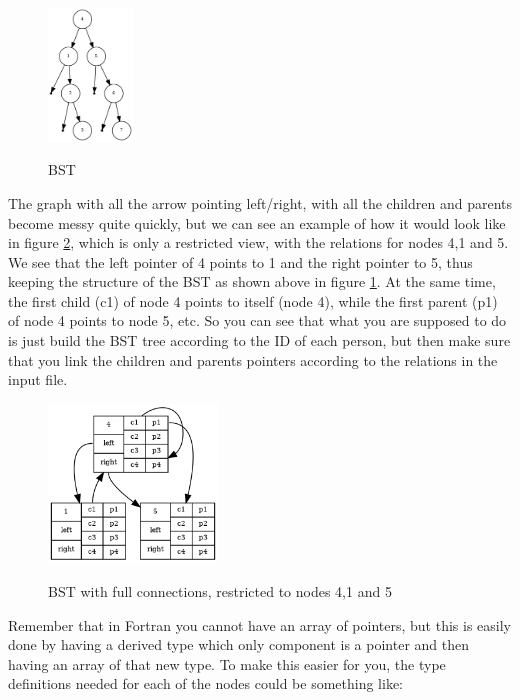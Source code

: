 \begin{figure}[!htbp]
  \centering
  \includegraphics[width=0.2\textwidth]{graphics/projects/gen2.png}
  \label{fig:genealogy-2}
  \caption{BST}
\end{figure}


The graph with all the arrow pointing left/right, with all the children and
parents become messy quite quickly, but we can see an example of how it would
look like in figure \ref{fig:genealogy-3}, which is only a restricted view, with
the relations for nodes 4,1 and 5. We see that the left pointer of 4 points to 1
and the right pointer to 5, thus keeping the structure of the BST as shown above
in figure \ref{fig:genealogy-2}. At the same time, the first child (c1) of node
4 points to itself (node 4), while the first parent (p1) of node 4 points to
node 5, etc. So you can see that what you are supposed to do is just build the
BST tree according to the ID of each person, but then make sure that you link
the children and parents pointers according to the relations in the input file.

\begin{figure}[!htbp]
  \centering
  \includegraphics[width=0.4\textwidth]{graphics/projects/gen3.png}
  \label{fig:genealogy-3}
  \caption{BST with full connections, restricted to nodes 4,1 and 5}
\end{figure}

Remember that in Fortran you cannot have an array of pointers, but this is
easily done by having a derived type which only component is a pointer and then
having an array of that new type. To make this easier for you, the type
definitions needed for each of the nodes could be something like:

